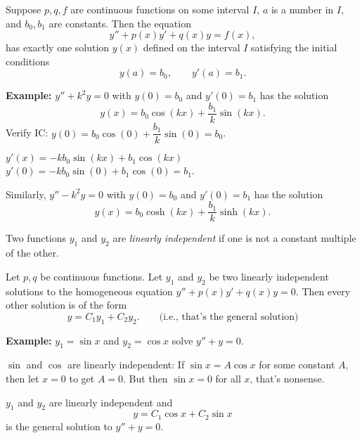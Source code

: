 \documentclass[10pt,aspectratio=169]{beamer}
\begin{document}
\begin{frame}

\begin{theorem}
Suppose $p, q, f$ are continuous functions on some interval
$I$, $a$ is a number in $I$,
and $b_0, b_1$ are constants.
\pause
Then the equation
\begin{equation*}
y'' + p(x) y' + q(x) y = f(x) ,
\end{equation*}
has exactly one solution $y(x)$ defined on the interval $I$ satisfying the initial conditions
\begin{equation*}
y(a) = b_0 , \qquad y'(a) = b_1 .
\end{equation*}
\end{theorem}

\pause

\textbf{Example:}
$y'' + k^2 y = 0$ with $y(0) = b_0$ and $y'(0) = b_1$ has the solution
\[
y(x) = b_0 \cos (kx) + \frac{b_1}{k} \sin (kx) .
\]
\pause
Verify IC: \quad $y(0) = b_0 \cos (0) + \dfrac{b_1}{k} \sin (0) = b_0$.

\medskip
\pause
$y'(x) = - k b_0 \sin (kx) + b_1 \cos (kx)$
\pause
\wthus
$y'(0) = - k b_0 \sin (0) + b_1 \cos (0) = b_1$.

\medskip
\pause

Similarly, $y'' - k^2 y = 0$ with $y(0) = b_0$ and $y'(0) = b_1$
has the solution
\[
y(x) = b_0 \cosh (kx) + \frac{b_1}{k} \sinh (kx) .
\]
\end{frame}

\begin{frame}
Two functions $y_1$ and $y_2$ are
\emph{linearly independent} if one is not a constant multiple of the other.

\pause

\begin{theorem}
Let $p, q$ be continuous functions.
Let $y_1$ and $y_2$ be two linearly independent
solutions to the homogeneous equation
$y'' + p(x) y' + q(x) y = 0$.
\pause
Then every other solution is 
of the form
\begin{equation*}
y = C_1 y_1 + C_2 y_2 .
\qquad \text{(i.e., that's the general solution)}
\end{equation*}
\end{theorem}

\pause

\textbf{Example:}
$y_1 = \sin x$ and $y_2 = \cos x$ solve $y'' + y = 0$.

\medskip
\pause

$\sin$ and $\cos$ are linearly independent:
\pause
If $\sin x = A \cos x$ for some constant $A$,
then let $x=0$ to get $A = 0$.
\pause But then $\sin x = 0$ for all
$x$, that's nonsense.

\medskip
\pause

$y_1$ and $y_2$ are linearly independent and
\[
y = C_1 \cos x + C_2 \sin x 
\]
is the general solution to $y'' + y = 0$.

\end{frame}
\end{document}

